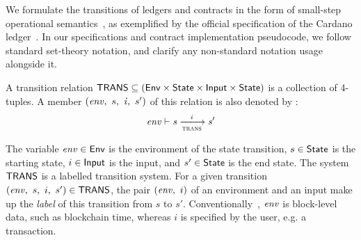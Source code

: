 We formulate the transitions of ledgers and contracts
in the form of small-step operational semantics~\cite{plotkin},
as exemplified by the official specification of the Cardano ledger~\cite{shelley,alonzo}.
In our specifications and contract implementation pseudocode,
we follow standard set-theory notation, and clarify any
non-standard notation usage alongside it.

A transition relation $\mathsf{TRANS} \subseteq (\mathsf{Env} \times \mathsf{State} \times \mathsf{Input} \times \mathsf{State})$
is a collection of 4-tuples. A member $(\mathit{env},~s,~\mathit{i},~s')$
of this relation is also denoted by :
  \begin{equation*}
    \var{env} \vdash
    \var{s} \trans{trans}{i} \var{s'}
  \end{equation*}

The variable $\mathit{env} \in \mathsf{Env}$ is the environment
of the state transition, $s \in \mathsf{State}$ is the starting state, $i \in \mathsf{Input}$ is the input,
and $s' \in \mathsf{State}$ is the end state.
The system $\mathsf{TRANS}$ is a labelled transition system.
For a given transition $(\mathit{env},~s,~i,~s') \in \mathsf{TRANS}$, the pair $(\mathit{env},~i)$
of an environment and an input make up the \emph{label} of this transition from $s$ to $s'$.
Conventionally~\cite{shelley}, $\mathit{env}$ is block-level data, such as blockchain time, whereas
$i$ is specified by the user, e.g. a transaction.

